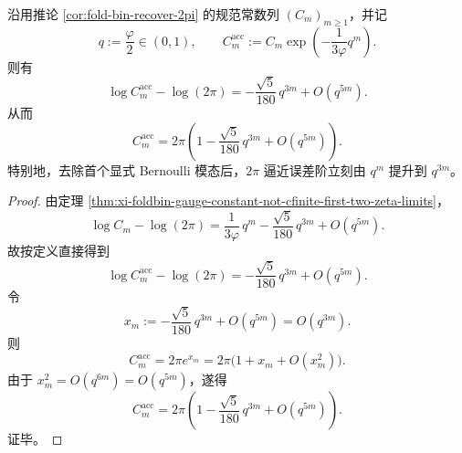 \begin{theorem}\label{thm:xi-foldbin-gauge-constant-one-step-acceleration-2pi}
沿用推论 \ref{cor:fold-bin-recover-2pi} 的规范常数列 \((C_m)_{m\ge 1}\)，并记
\[
q:=\frac{\varphi}{2}\in(0,1),
\qquad
C_m^{\mathrm{acc}}
:=
C_m\exp\!\left(-\frac{1}{3\varphi}q^m\right).
\]
则有
\[
\boxed{\;
\log C_m^{\mathrm{acc}}-\log(2\pi)
=
-\frac{\sqrt5}{180}\,q^{3m}+O(q^{5m}).\;}
\]
从而
\[
\boxed{\;
C_m^{\mathrm{acc}}
=
2\pi\left(1-\frac{\sqrt5}{180}\,q^{3m}+O(q^{5m})\right).\;}
\]
特别地，去除首个显式 Bernoulli 模态后，\(2\pi\) 逼近误差阶立刻由 \(q^m\) 提升到 \(q^{3m}\)。
\end{theorem}
\begin{proof}
由定理 \ref{thm:xi-foldbin-gauge-constant-not-cfinite-first-two-zeta-limits}，
\[
\log C_m-\log(2\pi)
=
\frac{1}{3\varphi}\,q^m-\frac{\sqrt5}{180}\,q^{3m}+O(q^{5m}).
\]
故按定义直接得到
\[
\log C_m^{\mathrm{acc}}-\log(2\pi)
=
-\frac{\sqrt5}{180}\,q^{3m}+O(q^{5m}).
\]
令
\[
x_m:=-\frac{\sqrt5}{180}\,q^{3m}+O(q^{5m})=O(q^{3m}).
\]
则
\[
C_m^{\mathrm{acc}}
=
2\pi e^{x_m}
=
2\pi\bigl(1+x_m+O(x_m^2)\bigr).
\]
由于 \(x_m^2=O(q^{6m})=O(q^{5m})\)，遂得
\[
C_m^{\mathrm{acc}}
=
2\pi\left(1-\frac{\sqrt5}{180}\,q^{3m}+O(q^{5m})\right).
\]
证毕。
\end{proof}

